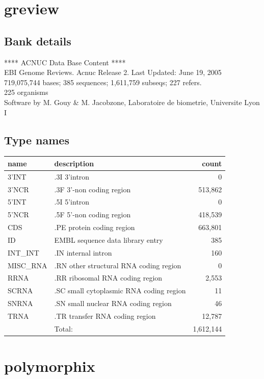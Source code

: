 \documentclass{article}
\begin{document}
\begin{Schunk}
\section{ greview }
\subsection{Bank details}
             ****     ACNUC Data Base Content      ****                         \\
        EBI Genome Reviews. Acnuc Release 2. Last Updated: June 19, 2005\\
719,075,744 bases; 385 sequences; 1,611,759 subseqs; 227 refers.\\
225 organisms\\
Software by M. Gouy \& M. Jacobzone, Laboratoire de biometrie, Universite Lyon I 

\subsection{Type names}
\noindent\begin{tabular}{llr}
\hline \hline
name & description & count \\
\hline
3'INT  &  .3I 3'intron  &  0 \\
3'NCR  &  .3F  3'-non coding region  &  513,862 \\
5'INT  &  .5I 5'intron  &  0 \\
5'NCR  &  .5F  5'-non coding region  &  418,539 \\
CDS  &  .PE protein coding region  &  663,801 \\
ID  &  EMBL sequence data library entry  &  385 \\
INT\_INT  &  .IN  internal intron  &  160 \\
MISC\_RNA  &  .RN other structural RNA coding region  &  0 \\
RRNA  &  .RR ribosomal RNA coding region  &  2,553 \\
SCRNA  &  .SC small cytoplasmic RNA coding region  &  11 \\
SNRNA  &  .SN small nuclear RNA coding region  &  46 \\
TRNA  &  .TR transfer RNA coding region  &  12,787 \\
\hline
 & Total: & 1,612,144 \\
\hline \hline
\end{tabular}

\section{ polymorphix }

\end{Schunk}
\end{document}

